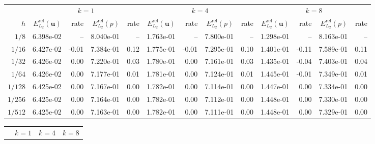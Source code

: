 \par\nolinenumbers
\begin{landscape}
\thispagestyle{empty}
\begin{center}
\centering
{}
\label{tab:annulus_thieulot_v1_p0_disc}
\small
\begin{tabular}{
r rr rr rr rr rr rr
}
\toprule
& \multicolumn{4}{c}{$k=1$} & \multicolumn{4}{c}{$k=4$} & \multicolumn{4}{c}{$k=8$} \\
\cmidrule(lr){2-5}\cmidrule(lr){6-9}\cmidrule(lr){10-13}
$h$ & $E_{L_2}^{\mathrm{rel}}(\mathbf{u})$ & rate & $E_{L_2}^{\mathrm{rel}}(p)$ & rate & $E_{L_2}^{\mathrm{rel}}(\mathbf{u})$ & rate & $E_{L_2}^{\mathrm{rel}}(p)$ & rate & $E_{L_2}^{\mathrm{rel}}(\mathbf{u})$ & rate & $E_{L_2}^{\mathrm{rel}}(p)$ & rate \\
\midrule
$1/8$ & 6.398e-02 & -- & 8.040e-01 & -- & 1.763e-01 & -- & 7.800e-01 & -- & 1.298e-01 & -- & 8.163e-01 & -- \\
$1/16$ & 6.427e-02 & -0.01 & 7.384e-01 & 0.12 & 1.775e-01 & -0.01 & 7.295e-01 & 0.10 & 1.401e-01 & -0.11 & 7.589e-01 & 0.11 \\
$1/32$ & 6.426e-02 & 0.00 & 7.220e-01 & 0.03 & 1.780e-01 & 0.00 & 7.161e-01 & 0.03 & 1.435e-01 & -0.04 & 7.403e-01 & 0.04 \\
$1/64$ & 6.426e-02 & 0.00 & 7.177e-01 & 0.01 & 1.781e-01 & 0.00 & 7.124e-01 & 0.01 & 1.445e-01 & -0.01 & 7.349e-01 & 0.01 \\
$1/128$ & 6.425e-02 & 0.00 & 7.167e-01 & 0.00 & 1.782e-01 & 0.00 & 7.114e-01 & 0.00 & 1.447e-01 & 0.00 & 7.334e-01 & 0.00 \\
$1/256$ & 6.425e-02 & 0.00 & 7.164e-01 & 0.00 & 1.782e-01 & 0.00 & 7.112e-01 & 0.00 & 1.448e-01 & 0.00 & 7.330e-01 & 0.00 \\
$1/512$ & 6.425e-02 & 0.00 & 7.163e-01 & 0.00 & 1.782e-01 & 0.00 & 7.111e-01 & 0.00 & 1.448e-01 & 0.00 & 7.329e-01 & 0.00 \\
\bottomrule
\end{tabular}
\end{center}
\begin{center}
\centering
{}
\label{tab:annulus_thieulot_v1_p1_cont}
\small
\begin{tabular}{
r rr rr rr rr rr rr
}
\toprule
& \multicolumn{4}{c}{$k=1$} & \multicolumn{4}{c}{$k=4$} & \multicolumn{4}{c}{$k=8$} \\

\end{tabular}
\end{center}
\end{landscape}
